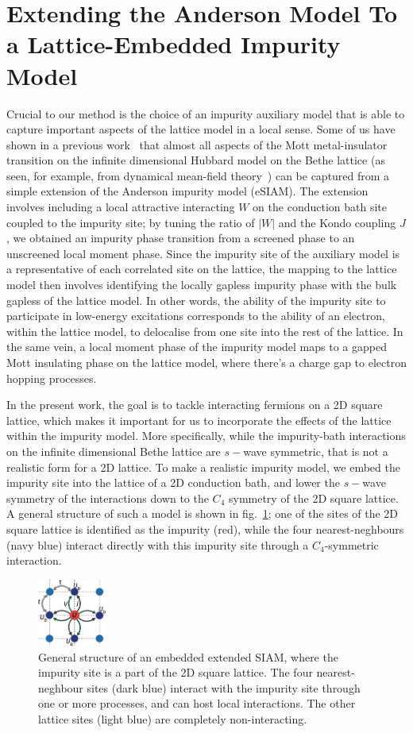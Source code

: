 \documentclass[reprint,hidelinks,onecolumn]{revtex4-2}
\begin{document}
\section{Extending the Anderson Model To a Lattice-Embedded Impurity Model}
Crucial to our method is the choice of an impurity auxiliary model that is able to capture important aspects of the lattice model in a local sense. Some of us have shown in a previous work~\cite{Mukherjee_2023} that almost all aspects of the Mott metal-insulator transition on the infinite dimensional Hubbard model on the Bethe lattice (as seen, for example, from dynamical mean-field theory~\cite{georges1996}) can be captured from a simple extension of the Anderson impurity model (eSIAM). The extension involves including a local attractive interacting \(W\) on the conduction bath site coupled to the impurity site; by tuning the ratio of \(|W|\) and the Kondo coupling \(J\), we obtained an impurity phase transition from a screened phase to an unscreened local moment phase. Since the impurity site of the auxiliary model is a representative of each correlated site on the lattice, the mapping to the lattice model then involves identifying the locally gapless impurity phase with the bulk gapless of the lattice model. In other words, the ability of the impurity site to participate in low-energy excitations corresponds to the ability of an electron, within the lattice model, to delocalise from one site into the rest of the lattice. In the same vein, a local moment phase of the impurity model maps to a gapped Mott insulating phase on the lattice model, where there's a charge gap to electron hopping processes.

In the present work, the goal is to tackle interacting fermions on a 2D square lattice, which makes it important for us to incorporate the effects of the lattice within the impurity model. More specifically, while the impurity-bath interactions on the infinite dimensional Bethe lattice are \(s-\)wave symmetric, that is not a realistic form for a 2D lattice. To make a realistic impurity model, we embed the impurity site into the lattice of a 2D conduction bath, and lower the \(s-\)wave symmetry of the interactions down to the \(C_4\) symmetry of the 2D square lattice. A general structure of such a model is shown in fig.~\ref{embeddedEsiam}; one of the sites of the 2D square lattice is identified as the impurity (red), while the four nearest-neghbours (navy blue) interact directly with this impurity site through a \(C_4\)-symmetric interaction.
\begin{figure}[htpb]
	\centering
	\includegraphics[width=0.2\textwidth]{pWaveEsiam.pdf}
	\caption{General structure of an embedded extended SIAM, where the impurity site is a part of the 2D square lattice. The four nearest-neghbour sites (dark blue) interact with the impurity site through one or more processes, and can host local interactions. The other lattice sites (light blue) are completely non-interacting.}
	\label{embeddedEsiam}
\end{figure}
\end{document}
